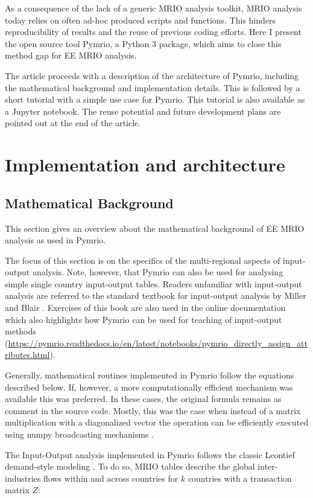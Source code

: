 \documentclass{jors}
\begin{document}
{As a consequence of the lack of a generic MRIO analysis toolkit, MRIO analysis today relies on often ad-hoc produced scripts and functions. This hinders reproducibility of results and the reuse of previous coding efforts.
Here I present the open source tool Pymrio, a Python 3 package, which aims to close this method gap for EE MRIO analysis.

The article proceeds with a description of the architecture of Pymrio, including the mathematical background and implementation details. 
This is followed by a short tutorial with a simple use case for Pymrio. This tutorial is also available as a Jupyter notebook. 
The reuse potential and future development plans are pointed out at the end of the article.


\section*{Implementation and architecture}

\subsection*{Mathematical Background}

This section gives an overview about the mathematical background of EE MRIO analysis as used in Pymrio. 

The focus of this section is on the specifics of the multi-regional aspects of input-output analysis. 
Note, however, that Pymrio can also be used for analysing simple single country input-output tables. 
Readers unfamiliar with input-output analysis are referred to the standard textbook for input-output analysis by Miller and Blair \cite{miller2009_Inputoutput}. Exercises of this book are also used in the online documentation which also highlights how Pymrio can be used for teaching of input-output methods (\url{https://pymrio.readthedocs.io/en/latest/notebooks/pymrio_directly_assign_attributes.html}). 

Generally, mathematical routines implemented in Pymrio follow the equations described below.
If, however, a more computationally efficient mechanism was available this was preferred.
In these cases, the original formula remains as comment in the source code.
Mostly,  this was the case when instead of a matrix multiplication with a diagonalized vector the operation can be efficiently executed using numpy broadcasting mechanisms \cite{vanderwalt2011_NumPy}.

The Input-Output analysis implemented in Pymrio follows the classic Leontief demand-style modeling  \cite{leontief1970_Environmental}.
To do so, MRIO tables describe the global inter-industries flows within and across countries for $k$ countries with a transaction matrix $Z$:

}
\end{document}
